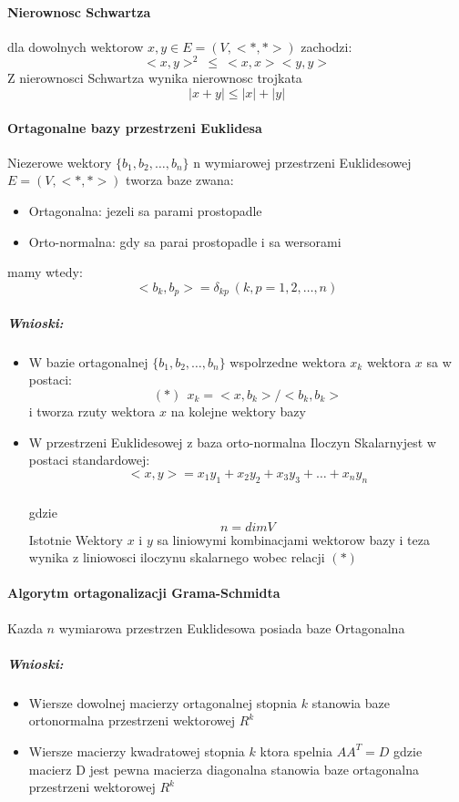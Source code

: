 \documentclass[a4paper]{article}
\begin{document}
\paragraph{Nierownosc Schwartza}
dla dowolnych wektorow $x,y \in E = (V,<*,*>)$ zachodzi:
\begin{equation}
    <x,y>^{2} \ \le \ <x,x> <y,y>
\end{equation}
Z nierownosci Schwartza wynika nierownosc trojkata
\begin{equation}
    |x+y|\le|x|+|y|
\end{equation}
\paragraph{Ortagonalne bazy przestrzeni Euklidesa}
Niezerowe wektory $\{b_{1}, b_{2}, \ldots ,b_{n}\}$ n wymiarowej przestrzeni Euklidesowej $E = (V,<*,*>)$ tworza baze zwana:
\begin{itemize}
    \item Ortagonalna: jezeli sa parami prostopadle
    \item Orto-normalna: gdy sa parai prostopadle i sa wersorami
\end{itemize}
mamy wtedy:
\begin{equation}
    <b_{k}, b_{p}> = \delta_{kp} \ (k,p = 1,2, \ldots , n)
\end{equation}
\subparagraph{Wnioski:}

\begin{itemize}
    \item W bazie ortagonalnej $\{b_{1}, b_{2}, \ldots ,b_{n}\}$ wspolrzedne wektora $x_{k}$ wektora $x$ sa w postaci:
    \begin{equation}
       (*) \ \ x_{k} = <x, b_{k}> / <b_{k}, b_{k}>
    \end{equation}
    i tworza rzuty wektora $x$ na kolejne wektory bazy
    \item W przestrzeni Euklidesowej z baza orto-normalna Iloczyn Skalarnyjest w postaci standardowej:
    \begin{equation}
        <x,y> = x_1 y_1 + x_2 y_2 + x_3 y_3 + \ldots + x_n y_n
    \end{equation}
    \subparagraph{} gdzie
    $$n = dim V$$
    Istotnie Wektory $x$ i $y$ sa liniowymi kombinacjami wektorow bazy i teza wynika z liniowosci iloczynu skalarnego wobec relacji $(*)$
\end{itemize}


\paragraph{Algorytm ortagonalizacji Grama-Schmidta}
Kazda $n$ wymiarowa przestrzen Euklidesowa posiada baze Ortagonalna
\subparagraph{Wnioski:}
\begin{itemize}
    \item Wiersze dowolnej macierzy ortagonalnej stopnia $k$ stanowia baze ortonormalna przestrzeni wektorowej $R^{k}$
    \item Wiersze macierzy kwadratowej stopnia $k$ ktora spelnia $AA^{T} = D$ gdzie macierz D jest pewna macierza diagonalna stanowia baze ortagonalna przestrzeni wektorowej $R^{k}$
\end{itemize}
\end{document}
